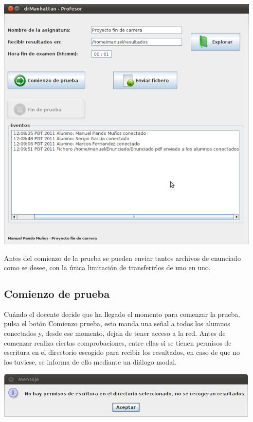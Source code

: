 \documentclass[11pt]{article}
\begin{document}
\begin{center}
    \includegraphics[width=.90\linewidth]{imagenes/eventoEnviar}
\end{center}

Antes del comienzo de la prueba se pueden enviar tantos archivos de enunciado como se desee, con la única limitación de transferirlos de uno en uno.

\subsection{Comienzo de prueba}

Cuándo el docente decide que ha llegado el momento para comenzar la prueba, pulsa el botón Comienzo prueba, esto manda una señal a todos los alumnos conectados y, desde ese momento, dejan de tener acceso a la red.
Antes de comenzar realiza ciertas comprobaciones, entre ellas si se tienen permisos de escritura en el directorio escogido para recibir los resultados, en caso de que no los tuviese, se informa de ello mediante un diálogo modal.

\begin{center}
    \includegraphics[width=.90\linewidth]{imagenes/comienzoPermisos}
\end{center}
\end{document}
